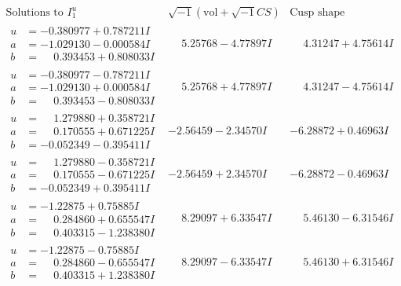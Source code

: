 \documentclass[1p]{elsarticle_modified}
\theoremstyle{definition}
\newcommand{\I}{\sqrt{-1}}
\begin{document}
$$\begin{array}{c|c|c}  
\text{Solutions to }I^u_{1}& \I (\text{vol} + \sqrt{-1}CS) & \text{Cusp shape}\\
 \hline 
\begin{aligned}
u &= -0.380977 + 0.787211 I \\
a &= -1.029130 - 0.000584 I \\
b &= \phantom{-}0.393453 + 0.808033 I\end{aligned}
 & \phantom{-}5.25768 - 4.77897 I & \phantom{-}4.31247 + 4.75614 I \\ \hline\begin{aligned}
u &= -0.380977 - 0.787211 I \\
a &= -1.029130 + 0.000584 I \\
b &= \phantom{-}0.393453 - 0.808033 I\end{aligned}
 & \phantom{-}5.25768 + 4.77897 I & \phantom{-}4.31247 - 4.75614 I \\ \hline\begin{aligned}
u &= \phantom{-}1.279880 + 0.358721 I \\
a &= \phantom{-}0.170555 + 0.671225 I \\
b &= -0.052349 - 0.395411 I\end{aligned}
 & -2.56459 - 2.34570 I & -6.28872 + 0.46963 I \\ \hline\begin{aligned}
u &= \phantom{-}1.279880 - 0.358721 I \\
a &= \phantom{-}0.170555 - 0.671225 I \\
b &= -0.052349 + 0.395411 I\end{aligned}
 & -2.56459 + 2.34570 I & -6.28872 - 0.46963 I \\ \hline\begin{aligned}
u &= -1.22875 + 0.75885 I \\
a &= \phantom{-}0.284860 + 0.655547 I \\
b &= \phantom{-}0.403315 - 1.238380 I\end{aligned}
 & \phantom{-}8.29097 + 6.33547 I & \phantom{-}5.46130 - 6.31546 I \\ \hline\begin{aligned}
u &= -1.22875 - 0.75885 I \\
a &= \phantom{-}0.284860 - 0.655547 I \\
b &= \phantom{-}0.403315 + 1.238380 I\end{aligned}
 & \phantom{-}8.29097 - 6.33547 I & \phantom{-}5.46130 + 6.31546 I \\ \hline\begin{aligned}

\end{aligned}
\end{array}$$
\end{document}
